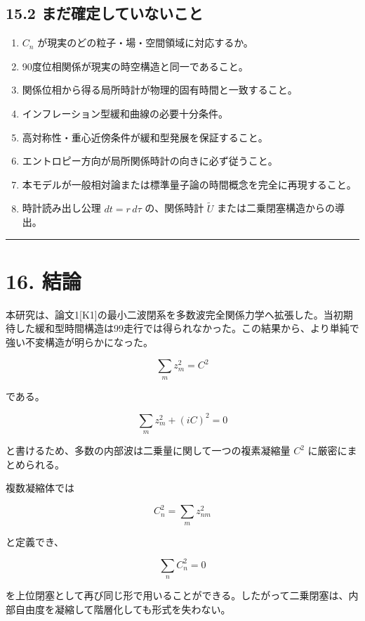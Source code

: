 \documentclass[
  a4paper,
]{ltjsarticle}
\providecommand{\tightlist}{%
  \setlength{\itemsep}{0pt}\setlength{\parskip}{0pt}}
\begin{document}
\subsection{15.2
まだ確定していないこと}\label{ux307eux3060ux78baux5b9aux3057ux3066ux3044ux306aux3044ux3053ux3068}

\begin{enumerate}
\def\labelenumi{\arabic{enumi}.}
\tightlist
\item
  \(C_n\) が現実のどの粒子・場・空間領域に対応するか。
\item
  90度位相関係が現実の時空構造と同一であること。
\item
  関係位相から得る局所時計が物理的固有時間と一致すること。
\item
  インフレーション型緩和曲線の必要十分条件。
\item
  高対称性・重心近傍条件が緩和型発展を保証すること。
\item
  エントロピー方向が局所関係時計の向きに必ず従うこと。
\item
  本モデルが一般相対論または標準量子論の時間概念を完全に再現すること。
\item
  時計読み出し公理 \(dt=r\,d\tau\) の、関係時計 \(\tilde U\)
  または二乗閉塞構造からの導出。
\end{enumerate}

\begin{center}\rule{0.5\linewidth}{0.5pt}\end{center}

\section{16. 結論}\label{ux7d50ux8ad6}

本研究は、論文1{[}K1{]}の最小二波閉系を多数波完全関係力学へ拡張した。当初期待した緩和型時間構造は99走行では得られなかった。この結果から、より単純で強い不変構造が明らかになった。

\[
\boxed{
\sum_m z_m^2=C^2
}
\]

である。

\[
\sum_mz_m^2+(iC)^2=0
\]

と書けるため、多数の内部波は二乗量に関して一つの複素凝縮量 \(C^2\)
に厳密にまとめられる。

複数凝縮体では

\[
C_n^2=\sum_mz_{nm}^2
\]

と定義でき、

\[
\boxed{
\sum_nC_n^2=0
}
\]

を上位閉塞として再び同じ形で用いることができる。したがって二乗閉塞は、内部自由度を凝縮して階層化しても形式を失わない。
\end{document}
